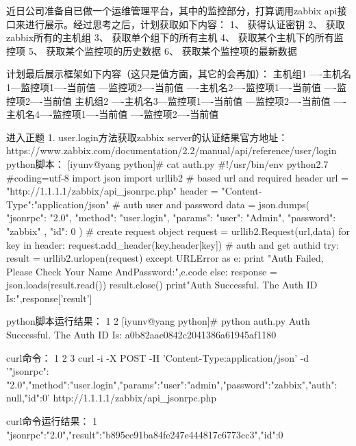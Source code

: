 
近日公司准备自已做一个运维管理平台，其中的监控部分，打算调用zabbix api接口来进行展示。经过思考之后，计划获取如下内容：
    1、  获得认证密钥
    2、  获取zabbix所有的主机组
    3、  获取单个组下的所有主机
    4、  获取某个主机下的所有监控项
    5、  获取某个监控项的历史数据
    6、  获取某个监控项的最新数据

计划最后展示框架如下内容（这只是值方面，其它的会再加）：
主机组1 ----主机名1---监控项1----当前值
                  ---监控项2----当前值
       ----主机名2----监控项1----当前值
                 ----监控项2----当前值
主机组2 ----主机名3---监控项1----当前值
                  ---监控项2----当前值
       ----主机名4----监控项1----当前值
                  ----监控项2----当前值

进入正题
1.     user.login方法获取zabbix server的认证结果官方地址：https://www.zabbix.com/documentation/2.2/manual/api/reference/user/login
python脚本：
[iyunv@yang python]# cat auth.py
#!/usr/bin/env python2.7
#coding=utf-8
import json
import urllib2
# based url and required header
url = "http://1.1.1.1/zabbix/api_jsonrpc.php"
header = {"Content-Type":"application/json"}
# auth user and password
data = json.dumps(
{
   "jsonrpc": "2.0",
   "method": "user.login",
   "params": {
   "user": "Admin",
   "password": "zabbix"
},
"id": 0
})
# create request object
request = urllib2.Request(url,data)
for key in header:
   request.add_header(key,header[key])
# auth and get authid
try:
   result = urllib2.urlopen(request)
except URLError as e:
   print "Auth Failed, Please Check Your Name AndPassword:",e.code
else:
   response = json.loads(result.read())
   result.close()
print"Auth Successful. The Auth ID Is:",response['result']



python脚本运行结果：
1
2
[iyunv@yang python]# python auth.py
Auth Successful. The Auth ID Is: a0b82aae0842c2041386a61945af1180



curl命令：
1
2
3
curl -i -X POST -H 'Content-Type:application/json' -d '{"jsonrpc":
"2.0","method":"user.login","params":{"user":"admin","password":"zabbix"},"auth":
null,"id":0}' http://1.1.1.1/zabbix/api_jsonrpc.php



curl命令运行结果：
1
{"jsonrpc":"2.0","result":"b895ce91ba84fe247e444817c6773cc3","id":0}




